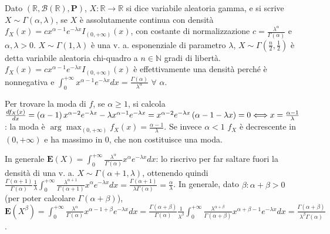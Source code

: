 \documentclass{article}
\begin{document}
\begin{enumerate}
Dato $\left( 
\mathbb{R}
,\mathcal{B}\left( 
\mathbb{R}
\right) ,\mathbf{P}\right) $, $X:%
\mathbb{R}
\rightarrow 
\mathbb{R}
$ si dice variabile aleatoria gamma, e si scrive $X\sim \Gamma \left( \alpha
,\lambda \right) $, se $X$ \`{e} assolutamente continua con densit\`{a} $%
f_{X}\left( x\right) =cx^{\alpha -1}e^{-\lambda x}I_{\left( 0,+\infty
\right) }\left( x\right) $, con costante di normalizzazione $c=\frac{\lambda
^{\alpha }}{\Gamma \left( \alpha \right) }$ e $\alpha ,\lambda >0$. $X\sim
\Gamma \left( 1,\lambda \right) $ \`{e} una v. a. esponenziale di parametro $%
\lambda $, $X\sim \Gamma \left( \frac{n}{2},\frac{1}{2}\right) $ \`{e} detta
variabile aleatoria chi-quadro a $n\in 
\mathbb{N}
$ gradi di libert\`{a}. $f_{X}\left( x\right) =cx^{\alpha -1}e^{-\lambda
x}I_{\left( 0,+\infty \right) }\left( x\right) $ \`{e} effettivamente una
densit\`{a} perch\'{e} \`{e} nonnegativa e $\int_{0}^{+\infty }x^{\alpha
-1}e^{-\lambda x}dx=\frac{\Gamma \left( \alpha \right) }{\lambda ^{\alpha }}$
$\forall $ $\alpha $.

Per trovare la moda di $f$, se $\alpha \geq 1$, si calcola $\frac{%
df_{X}\left( x\right) }{dx}=\left( \alpha -1\right) x^{\alpha -2}e^{-\lambda
x}-\lambda x^{\alpha -1}e^{-\lambda x}=x^{\alpha -2}e^{-\lambda x}\left(
\alpha -1-\lambda x\right) =0\Longleftrightarrow x=\frac{\alpha -1}{\lambda }
$: la moda \`{e} $\arg \max_{\left( 0,+\infty \right) }f_{X}\left( x\right) =%
\frac{\alpha -1}{\lambda }$. Se invece $\alpha <1$ $f_{X}$ \`{e} decrescente
in $\left( 0,+\infty \right) $ e ha massimo in $0$, che non costituisce una
moda.

In generale $\mathbf{E}\left( X\right) =\int_{0}^{+\infty }\frac{\lambda
^{\alpha }}{\Gamma \left( \alpha \right) }x^{\alpha }e^{-\lambda x}dx$: lo
riscrivo per far saltare fuori la densit\`{a} di una v. a. $X\sim \Gamma
\left( \alpha +1,\lambda \right) $, ottenendo quindi $\frac{\Gamma \left(
\alpha +1\right) }{\Gamma \left( \alpha \right) }\frac{1}{\lambda }%
\int_{0}^{+\infty }\frac{\lambda ^{\alpha +1}}{\Gamma \left( \alpha
+1\right) }x^{\alpha }e^{-\lambda x}dx=\frac{\Gamma \left( \alpha +1\right) 
}{\lambda \Gamma \left( \alpha \right) }=\frac{\alpha }{\lambda }$. In
generale, dato $\beta :\alpha +\beta >0$ (per poter calcolare $\Gamma \left(
\alpha +\beta \right) $), $\mathbf{E}\left( X^{\beta }\right)
=\int_{0}^{+\infty }\frac{\lambda ^{\alpha }}{\Gamma \left( \alpha \right) }%
x^{\alpha -1+\beta }e^{-\lambda x}dx=\frac{\Gamma \left( \alpha +\beta
\right) }{\Gamma \left( \alpha \right) }\frac{1}{\lambda ^{\beta }}%
\int_{0}^{+\infty }\frac{\lambda ^{\alpha +\beta }}{\Gamma \left( \alpha
+\beta \right) }x^{\alpha +\beta -1}e^{-\lambda x}dx=\frac{\Gamma \left(
\alpha +\beta \right) }{\lambda ^{\beta }\Gamma \left( \alpha \right) }$.


\end{enumerate}
\end{document}
